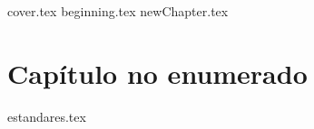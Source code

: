 \documentclass[11pt, oneside]{book}
\begin{document}
	{cover.tex}
	\frontmatter
		{beginning.tex}
		\tableofcontents
	\mainmatter
	{newChapter.tex}\cleanalldata
	\chapter*{Capítulo no enumerado}
	\appendix
		{estandares.tex}\cleanalldata
%	
%	
\end{document}
